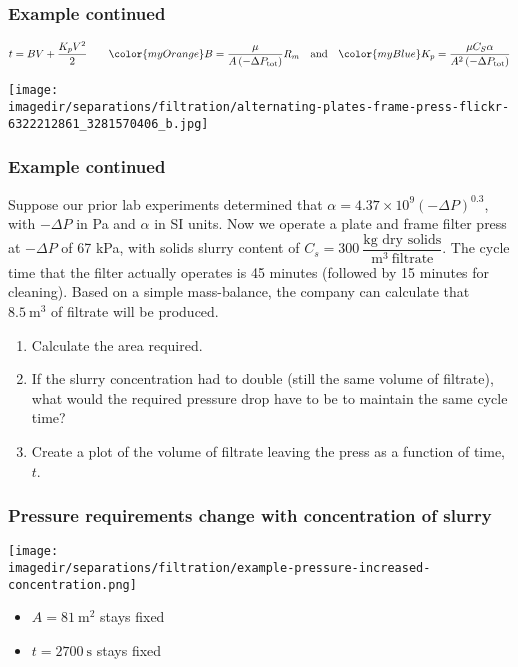 \begin{frame}\frametitle{Example continued}
	\[ t = BV +  \dfrac{K_pV^2}{2} 	\qquad {\color{myOrange}B = \dfrac{\mu}{A\left(-\Delta P_\text{tot}\right)} R_m } \quad \text{and} \quad {\color{myBlue}K_p = \dfrac{\mu C_S \alpha  }{A^2 \left(-\Delta P_\text{tot}\right)} } \]
	\begin{center}
		\texttt{[image: \\imagedir/separations/filtration/alternating-plates-frame-press-flickr-6322212861\_3281570406\_b.jpg]}
	\end{center}
	
\end{frame}

\begin{frame}\frametitle{Example continued}
	Suppose our prior lab experiments determined that $\alpha = 4.37\times 10^{9}\left(-\Delta P \right)^{0.3}$, with $-\Delta P$ in Pa and $\alpha$ in SI units.
	\vspace{12pt}
	Now we operate a plate and frame filter press at $-\Delta P$ of 67 kPa, with solids slurry content of $C_s = 300~\dfrac{\text{kg dry solids}}{\text{m}^3~\text{filtrate}}$. The cycle time that the filter actually operates is 45 minutes (followed by 15 minutes for cleaning). Based on a simple mass-balance, the company can calculate that $8.5~\text{m}^3$ of filtrate will be produced.
	
	\vspace{12pt}
	\begin{enumerate}
		\item	Calculate the area required.
		\item	If the slurry concentration had to double (still the same volume of filtrate), what would the required pressure drop have to be to maintain the same cycle time?
		\item	Create a plot of the volume of filtrate leaving the press as a function of time, $t$.
	\end{enumerate}	
\end{frame}

\begin{frame}\frametitle{Pressure requirements change with concentration of slurry}
	\begin{center}
		\texttt{[image: \\imagedir/separations/filtration/example-pressure-increased-concentration.png]}
	\end{center}
	\begin{itemize}
		\item	$A = 81~\text{m}^2$ stays fixed
		\item	$t = 2700~\text{s}$ stays fixed
	\end{itemize}
\end{frame}

